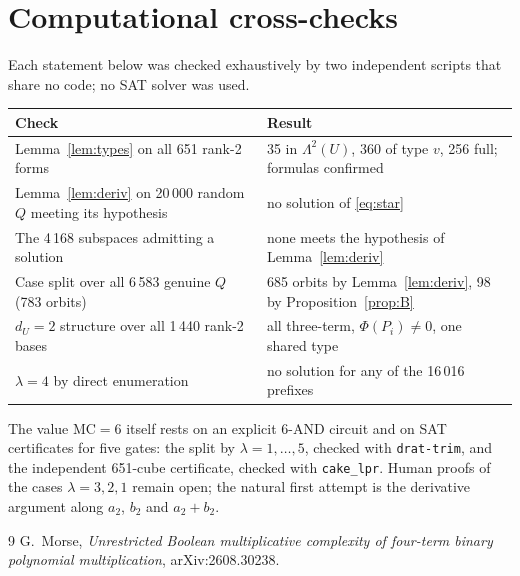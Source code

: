 \documentclass[11pt,a4paper]{article}
\theoremstyle{plain}
\theoremstyle{definition}
\theoremstyle{remark}
\newcommand{\Lam}{\Lambda^{2}}
\newcommand{\dU}{d_U}
\begin{document}
\section{Computational cross-checks}

Each statement below was checked exhaustively by two independent scripts that share no code; no SAT solver was used.

\begin{center}
\begin{tabularx}{0.92\textwidth}{@{}X X@{}}
\toprule
Check & Result \\
\midrule
Lemma~\ref{lem:types} on all 651 rank-2 forms & 35 in $\Lam(U)$, 360 of type $v$, 256 full; formulas confirmed\\
Lemma~\ref{lem:deriv} on 20\,000 random $Q$ meeting its hypothesis & no solution of \eqref{eq:star}\\
The 4\,168 subspaces admitting a solution & none meets the hypothesis of Lemma~\ref{lem:deriv}\\
Case split over all 6\,583 genuine $Q$ (783 orbits) & 685 orbits by Lemma~\ref{lem:deriv}, 98 by Proposition~\ref{prop:B}\\
$\dU=2$ structure over all 1\,440 rank-2 bases & all three-term, $\Phi(P_i)\ne0$, one shared type\\
$\lambda=4$ by direct enumeration & no solution for any of the 16\,016 prefixes\\
\bottomrule
\end{tabularx}
\end{center}

The value $\mathrm{MC}=6$ itself rests on an explicit 6-AND circuit and on SAT certificates for five gates: the split by $\lambda=1,\dots,5$, checked with \texttt{drat-trim}, and the independent 651-cube certificate, checked with \texttt{cake\_lpr}. Human proofs of the cases $\lambda=3,2,1$ remain open; the natural first attempt is the derivative argument along $a_2$, $b_2$ and $a_2+b_2$.

\begin{thebibliography}{9}
 G.~Morse, \emph{Unrestricted Boolean multiplicative complexity of four-term binary polynomial multiplication}, arXiv:2608.30238.
\end{thebibliography}
\end{document}
